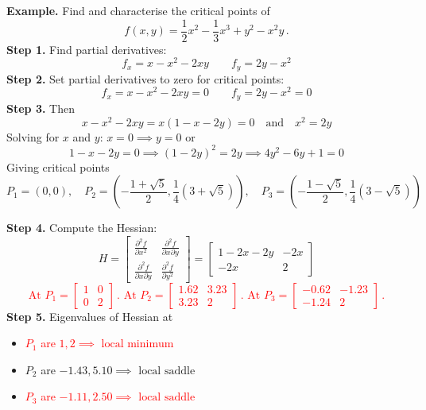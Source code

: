 \documentclass{article}
\begin{document}
\noindent
\textbf{Example.} Find and characterise the critical points of
$$
f(x,y) = \frac{1}{2} x^2 - \frac{1}{3} x^3 + y^2 - x^2 y\,.
$$
\textbf{Step 1.} Find partial derivatives:
$$
f_x = x - x^2 - 2 x y\qquad f_y = 2y - x^2
$$
\textbf{Step 2.} Set partial derivatives to zero for critical points:
$$
f_x = x - x^2 - 2 x y = 0 \qquad f_y = 2y - x^2 = 0
$$
\textbf{Step 3.} Then
$$
x - x^2 - 2 x y = x (1 - x - 2y) = 0 \quad \mbox{and} \quad x^2 = 2y
$$
Solving for $x$ and $y$: $x = 0 \implies y = 0$ or
$$
1 - x - 2y = 0 \implies (1- 2y)^2 = 2 y \implies 4y^2 - 6y + 1 = 0
$$
Giving critical points
{\small
$$
P_1 = (0,0), \quad P_2 = (-\frac{1+\sqrt{5}}{2},\frac{1}{4}\left( 3+\sqrt{5}\right)), \quad P_3 = (-\frac{1-\sqrt{5}}{2}, \frac{1}{4}\left( 3-\sqrt{5}\right))
$$
}


\noindent
\textbf{Step 4.} Compute the Hessian:
$$
H = \left[ \begin{array}{cc}
\frac{\partial ^2 f}{\partial x ^2} & \frac{\partial ^2 f}{\partial x \partial y}\\\frac{\partial ^2 f}{\partial x \partial y} & \frac{\partial ^2 f}{\partial y ^2} \end{array} \right]
= 
\left[ \begin{array}{cc} 1 - 2x -2y & -2x \\ -2x & 2 \end{array} \right]
$$
{\small
\textcolor{red}{
$$
\mbox{At } P_1 = \left[ \begin{array}{cc} 1 & 0 \\ 0 & 2 \end{array} \right]\,.
\mbox{ At } P_2 = \left[ \begin{array}{cc} 1.62 & 3.23 \\ 3.23 & 2\end{array} \right]\,.
\mbox{ At } P_3 = \left[ \begin{array}{cc} -0.62 & -1.23 \\ -1.24 & 2 \end{array} \right]\,.
$$
}
}
\textbf{Step 5.} Eigenvalues of Hessian at
\begin{itemize}
\item
\textcolor{red}{$P_1$ are $1, 2 \implies \mbox{ local minimum}$}
\item
$P_2$ are $-1.43, 5.10 \implies \mbox{ local saddle}$
\item
\textcolor{red}{$P_3$ are $-1.11, 2.50 \implies \mbox{ local saddle}$}
\end{itemize}
\end{document}
